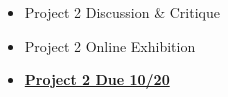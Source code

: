 \def\dMon{3/15}%
\def\dTues{3/16}%
\def\dWed{3/17}%
\def\dThur{3/18}%
\placeDate

\def\tues{10/20}%
\def\thur{10/22}%
% 
\begin{itemize}[noitemsep,topsep=0pt,leftmargin=*]
    \item Project 2 Discussion \& Critique
    \item Project 2 Online Exhibition
\end{itemize}
\begin{itemize}[noitemsep,topsep=0pt,leftmargin=*]
    \item \textcolor{defaultColor}{\ul{\textbf{Project 2 Due \tues}}}
\end{itemize}